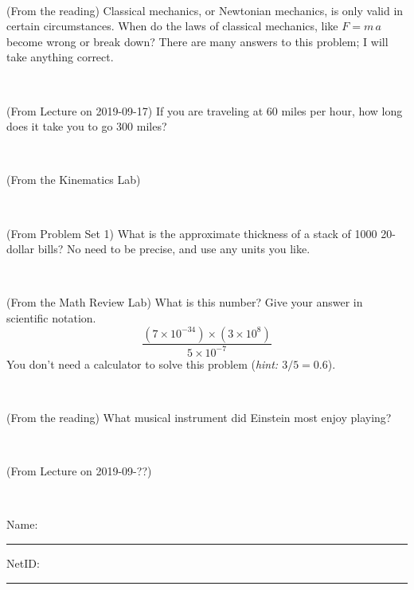 \documentclass[12pt, letterpaper]{article}
\begin{document}
\vfill ~

\begin{problem} (From the reading)
Classical mechanics, or Newtonian mechanics, is only valid in certain
circumstances. When do the laws of classical mechanics, like $F =
m\,a$ become wrong or break down? There are many answers to this
problem; I will take anything correct.
\end{problem}


\vfill ~

\begin{problem} (From Lecture on 2019-09-17)
If you are traveling at 60 miles per hour, how long does
it take you to go 300 miles?
\end{problem}


\vfill ~

\begin{problem} (From the Kinematics Lab)

\end{problem}


\vfill ~


\clearpage


\begin{problem} (From Problem Set 1)
What is the approximate thickness of a stack of 1000 20-dollar bills?
No need to be precise, and use any units you like.
\end{problem}


\vfill ~

\begin{problem} (From the Math Review Lab)
What is this number? Give your answer in scientific notation.
$$
\frac{(7\times10^{-34})\times(3\times10^8)}{5\times10^{-7}}
$$
You don't need a calculator to solve this problem (\textit{hint: $3/5=0.6$}).
\end{problem}


\vfill ~

\begin{problem} (From the reading)
What musical instrument did Einstein most enjoy playing?
\end{problem}


\vfill ~

\begin{problem} (From Lecture on 2019-09-??)
\end{problem}


\vfill ~


\cleardoublepage



\noindent
Name: \rule[-1ex]{0.60\textwidth}{0.1pt}
NetID: \rule[-1ex]{0.20\textwidth}{0.1pt}
\end{document}
